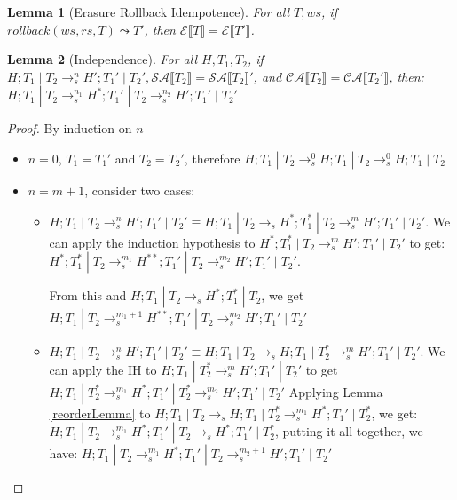 \documentclass[9pt]{article}
\newtheorem{lemma}{Lemma}
\newcommand\specStep{\rightarrow_{s}}
\newcommand{\erase}[1]{\mathcal{E}\llbracket #1 \rrbracket}
\newcommand{\specActions}[1]{\mathcal{SA} \llbracket #1 \rrbracket}
\newcommand{\commitActions}[1]{\mathcal{CA} \llbracket #1 \rrbracket}
\begin{document}
\begin{lemma}[Erasure Rollback Idempotence]
\label{eraseRollbackIdempotence}
For all $T, ws$, if $rollback(ws, rs, T) \leadsto T'$, then $\erase{T} = \erase{T'}$.

\end{lemma}

\begin{lemma}[Independence]
\label{independence}
For all $H, T_1, T_2$, if $H; T_1 \; | \; T_2 \specStep^n H'; T_1' \; | \; T_2', \specActions{T_2} = \specActions{T_2}'$,  and $\commitActions{T_2} = \commitActions{T_2'}$, then: $H; T_1 \; | \; T_2 \specStep^{n_1} H^*; T_1' \; | \; T_2 \specStep^{n_2} H'; T_1' \; | \; T_2'$
\end{lemma}

\begin{proof}
By induction on $n$ 
\begin{itemize}
\item $n = 0$, $T_1 = T_1'$ and $T_2 = T_2'$, therefore $H; T_1 \; | \; T_2 \specStep^0 H; T_1 \; | \; T_2 \specStep^0 H; T_1 \; | \; T_2$

\item $n = m+1$, consider two cases:

\begin{itemize}

\item $H; T_1 \; | \; T_2 \specStep^n H'; T_1' \; | \; T_2' \equiv H; T_1 \; | \; T_2 \specStep H^*; T_1^* \; | \; T_2 \specStep^m H'; T_1' \; | \; T_2'$.  We can apply the induction hypothesis to $H^*; T_1^* \; | \; T_2 \specStep^m H'; T_1' \; | \; T_2'$ to get: $H^*; T_1^* \; | \; T_2 \specStep^{m_1} H^{**}; T_1' \; | \; T_2 \specStep^{m_2} H'; T_1' \; | \; T_2'$.  

From this and $H; T_1 \; | \; T_2 \specStep H^*; T_1^* \; | \; T_2$, we get $H; T_1 \; | \; T_2  \specStep^{m_1+1} H^{**}; T_1' \; | \; T_2 \specStep^{m_2} H'; T_1' \; | \; T_2'$

\item $H; T_1 \; | \; T_2 \specStep^n H'; T_1' \; | \; T_2' \equiv H; T_1 \; | \; T_2 \specStep H; T_1 \; | \; T_2^* \specStep^m H'; T_1' \; | \; T_2'$. We can apply the IH to $H; T_1 \; | \; T_2^* \specStep^m H'; T_1' \; | \; T_2'$ to get $H; T_1 \; | \; T_2^* \specStep^{m_1} H^*; T_1' \; | \; T_2^* \specStep^{m_2} H'; T_1' \; | \; T_2'$
Applying Lemma \ref{reorderLemma} to $H; T_1 \; | \; T_2 \specStep H; T_1 \; | \; T_2^* \specStep^{m_1} H^*; T_1' \; | \; T_2^*$, we get: $H; T_1 \; | \; T_2 \specStep^{m_1} H^*; T_1' \; | \; T_2 \specStep H^*; T_1' \; | \; T_2^*$, putting it all together, we have: $H; T_1 \; | \; T_2 \specStep^{m_1} H^*; T_1' \; | \; T_2 \specStep^{m_2+1} H'; T_1' \; | \; T_2'$

\end{itemize}

\end{itemize}


\end{proof}
\end{document}
